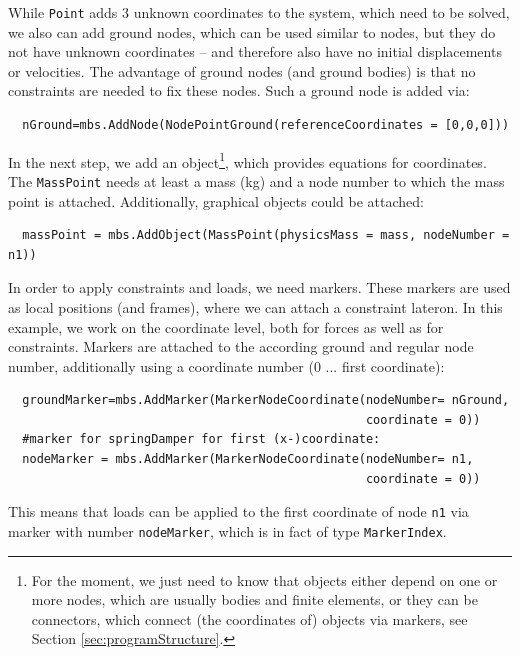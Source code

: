 %
While \texttt{Point} adds 3 unknown coordinates to the system, which need to be solved, we also can add ground nodes, which can be used similar to nodes, but they do not have unknown coordinates -- and therefore also have no initial displacements or velocities. The advantage of ground nodes (and ground bodies) is that no constraints are needed to fix these nodes.
%
Such a ground node is added via:
\pythonstyle\begin{lstlisting}
  nGround=mbs.AddNode(NodePointGround(referenceCoordinates = [0,0,0]))
\end{lstlisting}
%
In the next step, we add an object\footnote{For the moment, we just need to know that objects either depend on one or more nodes, which are usually bodies and finite elements, or they can be connectors, which connect (the coordinates of) objects via markers, see Section \ref{sec:programStructure}.}, which provides equations for coordinates. The \texttt{MassPoint} needs at least a mass (kg) and a node number to which the mass point is attached. Additionally, graphical objects could be attached:
\pythonstyle\begin{lstlisting}
  massPoint = mbs.AddObject(MassPoint(physicsMass = mass, nodeNumber = n1))
\end{lstlisting}
%
In order to apply constraints and loads, we need markers. These markers are used as local positions (and frames), where we can attach a constraint lateron. In this example, we work on the coordinate level, both for forces as well as for constraints.
Markers are attached to the according ground and regular node number, additionally using a coordinate number (0 ... first coordinate):
\pythonstyle\begin{lstlisting}
  groundMarker=mbs.AddMarker(MarkerNodeCoordinate(nodeNumber= nGround, 
                                                  coordinate = 0))
  #marker for springDamper for first (x-)coordinate:
  nodeMarker = mbs.AddMarker(MarkerNodeCoordinate(nodeNumber= n1, 
                                                  coordinate = 0))
\end{lstlisting}
This means that loads can be applied to the first coordinate of node \texttt{n1} via marker with number \texttt{nodeMarker},
which is in fact of type \texttt{MarkerIndex}.

